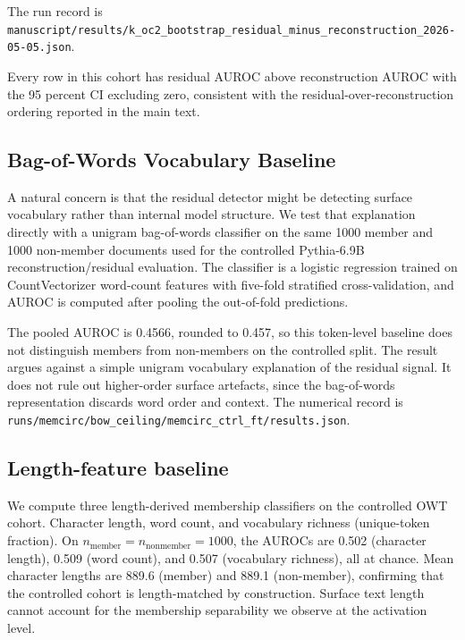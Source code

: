 The run record is \texttt{manuscript/\allowbreak{}results/\allowbreak{}k\_\allowbreak{}oc2\_\allowbreak{}bootstrap\_\allowbreak{}residual\_\allowbreak{}minus\_\allowbreak{}reconstruction\_\allowbreak{}2026-\allowbreak{}05-\allowbreak{}05.json}.

Every row in this cohort has residual AUROC above reconstruction AUROC with the 95 percent CI excluding zero, consistent with the residual-over-reconstruction ordering reported in the main text.

\subsection{Bag-of-Words Vocabulary Baseline}
\label{app:bow_baseline}

A natural concern is that the residual detector might be detecting surface vocabulary rather than internal model structure. We test that explanation directly with a unigram bag-of-words classifier on the same 1000 member and 1000 non-member documents used for the controlled Pythia-6.9B reconstruction/residual evaluation. The classifier is a logistic regression trained on CountVectorizer word-count features with five-fold stratified cross-validation, and AUROC is computed after pooling the out-of-fold predictions.

The pooled AUROC is 0.4566, rounded to 0.457, so this token-level baseline does not distinguish members from non-members on the controlled split. The result argues against a simple unigram vocabulary explanation of the residual signal. It does not rule out higher-order surface artefacts, since the bag-of-words representation discards word order and context. The numerical record is \texttt{runs/\allowbreak{}memcirc/\allowbreak{}bow\_\allowbreak{}ceiling/\allowbreak{}memcirc\_\allowbreak{}ctrl\_\allowbreak{}ft/\allowbreak{}results.json}.

\subsection{Length-feature baseline}
\label{app:length_baseline}

We compute three length-derived membership classifiers on the controlled OWT cohort. Character length, word count, and vocabulary richness (unique-token fraction). On $n_{\mathrm{member}}=n_{\mathrm{nonmember}}=1000$, the AUROCs are 0.502 (character length), 0.509 (word count), and 0.507 (vocabulary richness), all at chance. Mean character lengths are 889.6 (member) and 889.1 (non-member), confirming that the controlled cohort is length-matched by construction. Surface text length cannot account for the membership separability we observe at the activation level.


